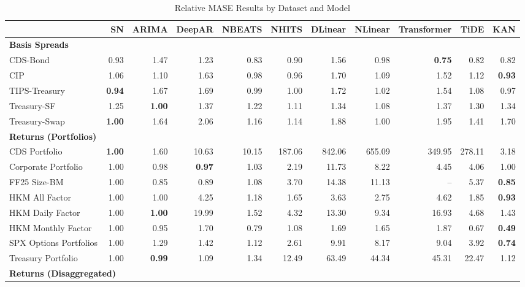 
\begin{table}[htbp]
\centering
\caption{Relative MASE Results by Dataset and Model}
\label{tab:relative_mase_results}
\scriptsize
\setlength{\tabcolsep}{1.5pt}
\renewcommand{\arraystretch}{0.9}
\begin{tabular}{@{}lrrrrrrrrrr@{}}
\toprule
 & SN & ARIMA & DeepAR & NBEATS & NHITS & DLinear & NLinear & Transformer & TiDE & KAN \\
\midrule
\multicolumn{11}{l}{\textbf{Basis Spreads}} \\
CDS-Bond & 0.93 & 1.47 & 1.23 & 0.83 & 0.90 & 1.56 & 0.98 & \textbf{0.75} & 0.82 & 0.82 \\
CIP & 1.06 & 1.10 & 1.63 & 0.98 & 0.96 & 1.70 & 1.09 & 1.52 & 1.12 & \textbf{0.93} \\
TIPS-Treasury & \textbf{0.94} & 1.67 & 1.69 & 0.99 & 1.00 & 1.72 & 1.02 & 1.54 & 1.08 & 0.97 \\
Treasury-SF & 1.25 & \textbf{1.00} & 1.37 & 1.22 & 1.11 & 1.34 & 1.08 & 1.37 & 1.30 & 1.34 \\
Treasury-Swap & \textbf{1.00} & 1.64 & 2.06 & 1.16 & 1.14 & 1.88 & 1.00 & 1.95 & 1.41 & 1.70 \\
\midrule
\multicolumn{11}{l}{\textbf{Returns (Portfolios)}} \\
CDS Portfolio & \textbf{1.00} & 1.60 & 10.63 & 10.15 & 187.06 & 842.06 & 655.09 & 349.95 & 278.11 & 3.18 \\
Corporate Portfolio & 1.00 & 0.98 & \textbf{0.97} & 1.03 & 2.19 & 11.73 & 8.22 & 4.45 & 4.06 & 1.00 \\
FF25 Size-BM & 1.00 & 0.85 & 0.89 & 1.08 & 3.70 & 14.38 & 11.13 & -- & 5.37 & \textbf{0.85} \\
HKM All Factor & 1.00 & 1.00 & 4.25 & 1.18 & 1.65 & 3.63 & 2.75 & 4.62 & 1.85 & \textbf{0.93} \\
HKM Daily Factor & 1.00 & \textbf{1.00} & 19.99 & 1.52 & 4.32 & 13.30 & 9.34 & 16.93 & 4.68 & 1.43 \\
HKM Monthly Factor & 1.00 & 0.95 & 1.70 & 0.79 & 1.08 & 1.69 & 1.65 & 1.87 & 0.67 & \textbf{0.49} \\
SPX Options Portfolios & 1.00 & 1.29 & 1.42 & 1.12 & 2.61 & 9.91 & 8.17 & 9.04 & 3.92 & \textbf{0.74} \\
Treasury Portfolio & 1.00 & \textbf{0.99} & 1.09 & 1.34 & 12.49 & 63.49 & 44.34 & 45.31 & 22.47 & 1.12 \\
\midrule
\multicolumn{11}{l}{\textbf{Returns (Disaggregated)}} \\

\end{tabular}
\end{table}

